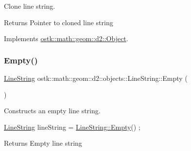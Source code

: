 Clone line string. 

\begin{DoxyReturn}{Returns}
Pointer to cloned line string 
\end{DoxyReturn}


Implements \hyperlink{classostk_1_1math_1_1geom_1_1d2_1_1_object_a98dedc6792aef35308966ca768eb3e14}{ostk\+::math\+::geom\+::d2\+::\+Object}.

\mbox{\label{classostk_1_1math_1_1geom_1_1d2_1_1objects_1_1_line_string_a3557befd15577368d8cc2f9c2a74dfec}} 
\subsubsection{\texorpdfstring{Empty()}{Empty()}}
{\footnotesize\ttfamily \hyperlink{classostk_1_1math_1_1geom_1_1d2_1_1objects_1_1_line_string}{Line\+String} ostk\+::math\+::geom\+::d2\+::objects\+::\+Line\+String\+::\+Empty (\begin{DoxyParamCaption}{ }\end{DoxyParamCaption})\hspace{0.3cm}{\ttfamily [static]}}



Constructs an empty line string. 


\begin{DoxyCode}
\hyperlink{classostk_1_1math_1_1geom_1_1d2_1_1objects_1_1_line_string_ae99b409ec3eddf804a7c83f2452b1249}{LineString} lineString = \hyperlink{classostk_1_1math_1_1geom_1_1d2_1_1objects_1_1_line_string_a3557befd15577368d8cc2f9c2a74dfec}{LineString::Empty}() ;
\end{DoxyCode}


\begin{DoxyReturn}{Returns}
Empty line string 
\end{DoxyReturn}
\mbox{\label{classostk_1_1math_1_1geom_1_1d2_1_1objects_1_1_line_string_ac8336b4c3418337eb1b04f6eb7e11927}} 
